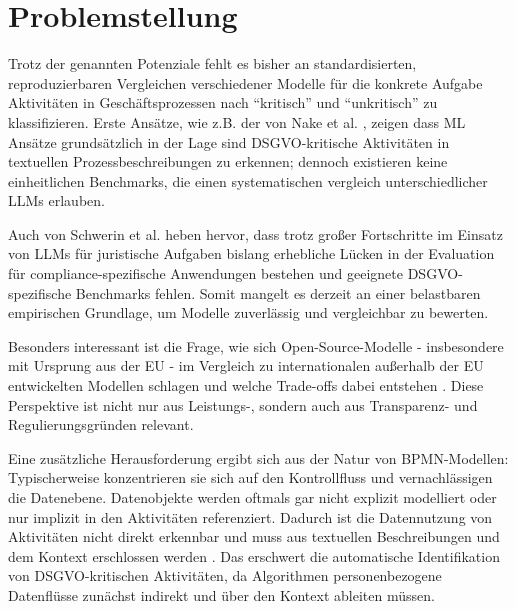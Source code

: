 \section{Problemstellung}\label{sec:problemstellung}

Trotz der genannten Potenziale fehlt es bisher an standardisierten, reproduzierbaren Vergleichen verschiedener Modelle für die konkrete Aufgabe Aktivitäten in Geschäftsprozessen nach \enquote{kritisch} und \enquote{unkritisch} zu klassifizieren. Erste Ansätze, wie z.B. der von Nake et al. \cite{nake2023towards}, zeigen dass ML Ansätze grundsätzlich in der Lage sind \ac{DSGVO}-kritische Aktivitäten in textuellen Prozessbeschreibungen zu erkennen; dennoch existieren keine einheitlichen Benchmarks, die einen systematischen vergleich unterschiedlicher \acp{LLM} erlauben.

Auch von Schwerin et al. \cite{schwerin2024systematic} heben hervor, dass trotz großer Fortschritte im Einsatz von \acp{LLM} für juristische Aufgaben bislang erhebliche Lücken in der Evaluation für compliance-spezifische Anwendungen bestehen und geeignete \ac{DSGVO}-spezifische Benchmarks fehlen. Somit mangelt es derzeit an einer belastbaren empirischen Grundlage, um Modelle zuverlässig und vergleichbar zu bewerten.

Besonders interessant ist die Frage, wie sich Open-Source-Modelle - insbesondere mit Ursprung aus der \ac{EU} - im Vergleich zu internationalen außerhalb der \ac{EU} entwickelten Modellen schlagen und welche Trade-offs dabei entstehen \cite{schwerin2024systematic}. Diese Perspektive ist nicht nur aus Leistungs-, sondern auch aus Transparenz- und Regulierungsgründen relevant.

Eine zusätzliche Herausforderung ergibt sich aus der Natur von \ac{BPMN}-Modellen: Typischerweise konzentrieren sie sich auf den Kontrollfluss und vernachlässigen die Datenebene. Datenobjekte werden oftmals gar nicht explizit modelliert oder nur implizit in den Aktivitäten referenziert. Dadurch ist die Datennutzung von Aktivitäten nicht direkt erkennbar und muss aus textuellen Beschreibungen und dem Kontext erschlossen werden \cite{schneid2021uncovering}. Das erschwert die automatische Identifikation von \ac{DSGVO}-kritischen Aktivitäten, da Algorithmen personenbezogene Datenflüsse zunächst indirekt und über den Kontext ableiten müssen.